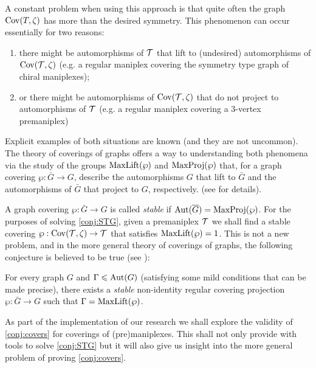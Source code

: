 A constant problem when using this approach is that quite often the graph $\operatorname{Cov}(T, \zeta)$ has more than the desired symmetry. 
This phenomenon can occur essentially for two reasons:
\begin{enumerate}[label=\textit{\roman*)}]
  \item there might be automorphisms of $\mathcal{T}$ that lift to (undesired) automorphisms of $\operatorname{Cov}(\mathcal{T},\zeta)$ (e.g. a regular maniplex covering the symmetry type graph of chiral maniplexes);
  \item or there might be automorphisms of $\operatorname{Cov}(\mathcal{T},\zeta)$ that do not project to automorphisms of $\mathcal{T}$ (e.g. a regular maniplex covering a $3$-vertex premaniplex) 
\end{enumerate}

Explicit examples of both situations are known  (and they are not uncommon). 
The theory of coverings of graphs offers a way to understanding both phenomena via the study of the groups $\operatorname{MaxLift}(\wp)$ and $\operatorname{MaxProj}(\wp)$ that, for a graph covering $\wp: \bar{G} \to G$, describe the automorphisms $G$ that lift to $\bar{G}$ and the automorphisms of $\bar{G}$ that project to $G$, respectively. (see \cite{MalniPozar2016_SplitStructureLifted,MalniPozar2019_SplitLiftingsSectional,MalnMarPot2004_ElementaryAbelianCovers,MalnNedSko2000_LiftingGraphAutomorphisms} for details).

A graph covering $\wp: \bar{G} \to G$ is called \emph{stable} if $\operatorname{Aut}(\overline{G}) = \operatorname{MaxProj}(\wp)$. 
For the purposes of solving \cref{conj:STG}, given a premaniplex $\mathcal{T}$ we shall find a stable covering $\wp: \operatorname{Cov}(\mathcal{T}, \zeta) \to \mathcal{T}$ that satisfies $\operatorname{MaxLift}(\wp) = 1$. 
This is not a new problem, and in the more general theory of coverings of graphs,  the following conjecture is believed to be true (see \cite{PotocSpiga2019_LiftingPrescribedGroup}):

\begin{conj}\label{conj:covers}
  For every graph $G$  and $\Gamma \leqslant \operatorname{Aut}(G)$ (satisfying some mild conditions that can be made precise), there exists a \emph{ stable} non-identity regular covering projection $\wp \colon \bar{G} \to G$ 
such that $\Gamma = \operatorname{MaxLift}(\wp)$.
\end{conj}

As part of the implementation of our research we shall explore the validity of \cref{conj:covers} for coverings of (pre)maniplexes. 
This shall not only provide with tools to solve \cref{conj:STG} but it will also give us insight into the more general problem of proving \cref{conj:covers}.


